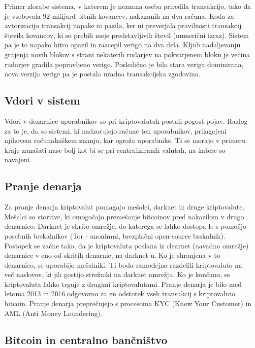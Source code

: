 \documentclass[letterpaper, titlepage, freqn]{article}
\begin{document}
Primer zlorabe sistema, v katerem je neznana oseba priredila transakcijo, tako da je vsebovala 92 milijard bitnih kovancev, nakazanih na dva računa. Koda za avtorizacijo transakcij napake ni pazila, ker ni preverjala pravilnosti transakcij števila kovancov, ki so prebili meje predstavljivih števil (numerični izraz). Sistem pa je to napako hitro opazil in razcepil verigo na dva dela. Kljub nadaljevanju grajenja novih blokov s strani nekaterih rudarjev na pokvarjenem bloku je večina rudarjev gradila popravljeno verigo. Posledično je bila stara veriga dominirana, nova verzija verige pa je postala uradna transakcijska zgodovina.

\subsection{Vdori v sistem}

Vdori v denarnice uporabnikov so pri kriptovalutah postali pogost pojav. Razlog za to je, da so sistemi, ki nadzorujejo račune teh uporabnikov, prilagojeni njihovem računalniškem znanju, kar ogroža uporabnike. Ti se morajo v primeru kraje zanašati nase bolj kot bi se pri centraliziranih valutah, na katere so navajeni.

\subsection{Pranje denarja}

Za pranje denarja kriptovalut pomagajo mešalci, darknet in druge kriptovalute. Mešalci so storitve, ki omogočajo premešanje bitcoinov pred nakazilom v drugo denarnico. Darknet je skrito omrežje, do katerega se lahko dostopa le s pomočjo posebnih brskalnikov (Tor - anonimni, brezplačni open-source brskalnik). Postopek se začne tako, da je kriptovaluta poslana iz clearnet (navadno omrežje) denarnice v eno od skritih denarnic, na darknet-u. Ko je shranjena v to denarnico, se uporabijo mešalniki. Ti bodo samodejno razdelili kriptovaluto na več naslovov, ki jih gostijo strežniki na darknet omrežju. Ko je končano, se kriptovaluta lahko trguje z drugimi kriptovalutami.
Pranje denarja je bilo med letoma 2013 in 2016 odgovorno za en odstotek vseh transakcij s kriptovaluto bitcoin. Pranje denarja preprečujejo s procesoma KYC (Know Your Customer) in AML (Anti Money Laundering).\\

\subsection{Bitcoin in centralno bančništvo}
\end{document}
